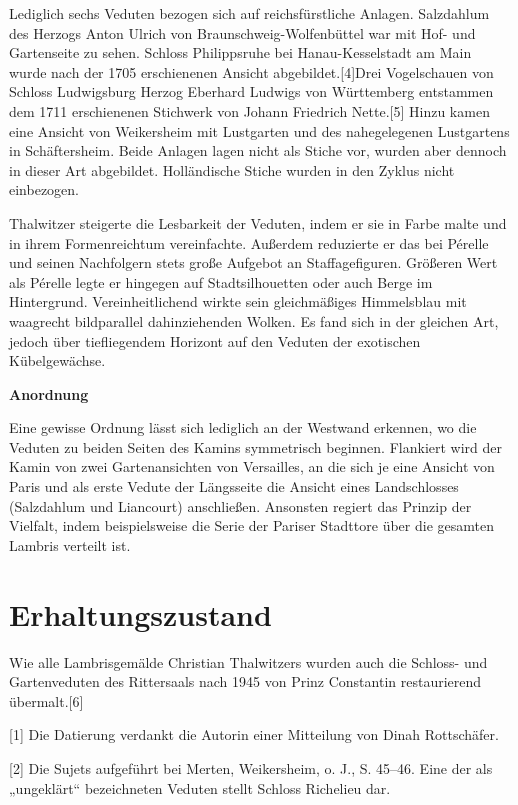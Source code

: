 \documentclass[
  letterpaper,
]{book}
\begin{document}
Lediglich sechs Veduten bezogen sich auf reichsfürstliche Anlagen.
Salzdahlum des Herzogs Anton Ulrich von Braunschweig-Wolfenbüttel war
mit Hof- und Gartenseite zu sehen. Schloss Philippsruhe bei
Hanau-Kesselstadt am Main wurde nach der 1705 erschienenen Ansicht
abgebildet.{[}4{]}Drei Vogelschauen von Schloss Ludwigsburg Herzog
Eberhard Ludwigs von Württemberg entstammen dem 1711 erschienenen
Stichwerk von Johann Friedrich Nette.{[}5{]} Hinzu kamen eine Ansicht
von Weikersheim mit Lustgarten und des nahegelegenen Lustgartens in
Schäftersheim. Beide Anlagen lagen nicht als Stiche vor, wurden aber
dennoch in dieser Art abgebildet. Holländische Stiche wurden in den
Zyklus nicht einbezogen.

Thalwitzer steigerte die Lesbarkeit der Veduten, indem er sie in Farbe
malte und in ihrem Formenreichtum vereinfachte. Außerdem reduzierte er
das bei Pérelle und seinen Nachfolgern stets große Aufgebot an
Staffagefiguren. Größeren Wert als Pérelle legte er hingegen auf
Stadtsilhouetten oder auch Berge im Hintergrund. Vereinheitlichend
wirkte sein gleichmäßiges Himmelsblau mit waagrecht bildparallel
dahinziehenden Wolken. Es fand sich in der gleichen Art, jedoch über
tiefliegendem Horizont auf den Veduten der exotischen Kübelgewächse.

\textbf{Anordnung}

Eine gewisse Ordnung lässt sich lediglich an der Westwand erkennen, wo
die Veduten zu beiden Seiten des Kamins symmetrisch beginnen. Flankiert
wird der Kamin von zwei Gartenansichten von Versailles, an die sich je
eine Ansicht von Paris und als erste Vedute der Längsseite die Ansicht
eines Landschlosses (Salzdahlum und Liancourt) anschließen. Ansonsten
regiert das Prinzip der Vielfalt, indem beispielsweise die Serie der
Pariser Stadttore über die gesamten Lambris verteilt ist.

\section{\texorpdfstring{\textbf{Erhaltungszustand}}{Erhaltungszustand}}\label{erhaltungszustand}

Wie alle Lambrisgemälde Christian Thalwitzers wurden auch die Schloss-
und Gartenveduten des Rittersaals nach 1945 von Prinz Constantin
restaurierend übermalt.{[}6{]}

{[}1{]} Die Datierung verdankt die Autorin einer Mitteilung von Dinah
Rottschäfer.

{[}2{]} Die Sujets aufgeführt bei Merten, Weikersheim, o. J., S. 45--46.
Eine der als „ungeklärt`` bezeichneten Veduten stellt Schloss Richelieu
dar.
\end{document}
